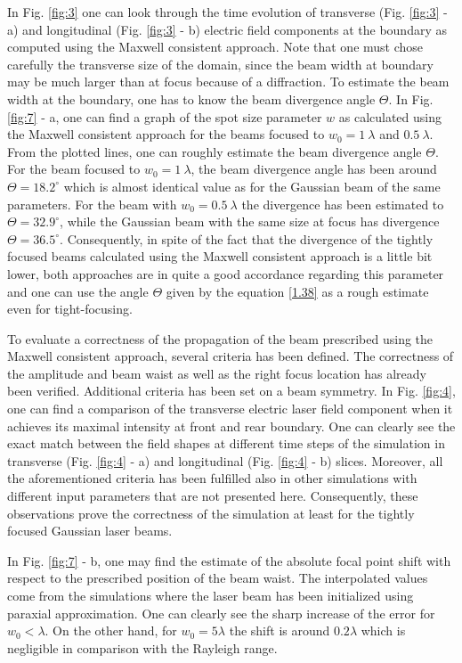 In Fig. \ref{fig:3} one can look through the time evolution of transverse (Fig. \ref{fig:3} - a) and longitudinal (Fig. \ref{fig:3} - b) electric field components at the boundary as computed using the Maxwell consistent approach. Note that one must chose carefully the transverse size of the domain, since the beam width at boundary may be much larger than at focus because of a diffraction. To estimate the beam width at the boundary, one has to know the beam divergence angle $ \Theta $. In Fig. \ref{fig:7} - a, one can find a graph of the spot size parameter $ w $ as calculated using the Maxwell consistent approach for the beams focused to $ w_0 = 1 \: \lambda $ and $ 0.5 \: \lambda $. From the plotted lines, one can roughly estimate the beam divergence angle $ \Theta $. For the beam focused to $ w_0 = 1 \: \lambda $, the beam divergence angle has been around $ \Theta = 18.2 ^{\circ} $ which is almost identical value as for the Gaussian beam of the same parameters. For the beam with $ w_0 = 0.5 \: \lambda $ the divergence has been estimated to $ \Theta = 32.9 ^{\circ} $, while the Gaussian beam with the same size at focus has divergence $ \Theta = 36.5 ^{\circ} $. Consequently, in spite of the fact that the divergence of the tightly focused beams calculated using the Maxwell consistent approach is a little bit lower, both approaches are in quite a good accordance regarding this parameter and one can use the angle $ \Theta $ given by the equation \ref{1.38} as a rough estimate even for tight-focusing.

To evaluate a correctness of the propagation of the beam prescribed using the Maxwell consistent approach, several criteria has been defined. The correctness of the amplitude and beam waist as well as the right focus location has already been verified. Additional criteria has been set on a beam symmetry. In Fig. \ref{fig:4}, one can find a comparison of the transverse electric laser field component when it achieves its maximal intensity at front and rear boundary. One can clearly see the exact match between the field shapes at different time steps of the simulation in transverse (Fig. \ref{fig:4} - a) and longitudinal (Fig. \ref{fig:4} - b) slices. Moreover, all the aforementioned criteria has been fulfilled also in other simulations with different input parameters that are not presented here. Consequently, these observations prove the correctness of the simulation at least for the tightly focused Gaussian laser beams.

In Fig. \ref{fig:7} - b, one may find the estimate of the absolute focal point shift with respect to the prescribed position of the beam waist. The interpolated values come from the simulations where the laser beam has been initialized using paraxial approximation. One can clearly see the sharp increase of the error for $ w_0 < \lambda $. On the other hand, for $ w_0 = 5 \lambda $ the shift is around $ 0.2 \lambda $ which is negligible in comparison with the Rayleigh range.

